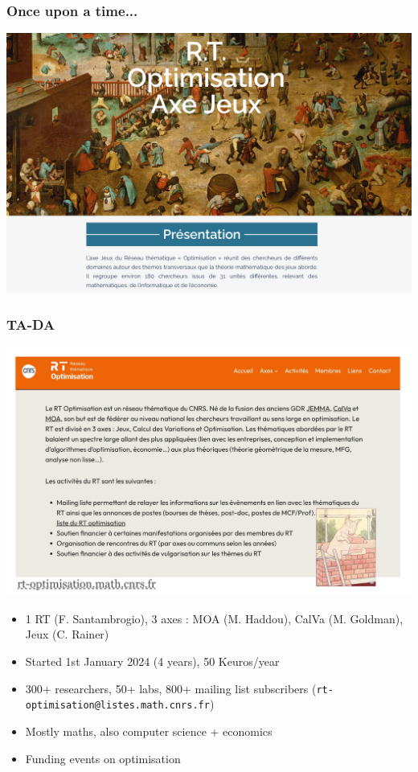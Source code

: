 \documentclass[9pt]{beamer}
\begin{document}
\begin{frame}
\frametitle{\bf Once upon a time...}
\centering \includegraphics[width=.99\textwidth]{jeux}
\end{frame}

\begin{frame}

\frametitle{\bf TA-DA}
\centering \includegraphics[width=.8\textwidth]{rt-opti}
\begin{itemize}
\item 1 RT (F. Santambrogio), 3 axes : MOA (M. Haddou), CalVa (M. Goldman), Jeux (C. Rainer)
\item Started 1st January 2024 (4 years), 50 Keuros/year
\item 300+ researchers, 50+ labs, 800+ mailing list subscribers (\texttt{rt-optimisation@listes.math.cnrs.fr})
\item Mostly maths, also computer science + economics
\item Funding events on optimisation
\end{itemize}

\end{frame}
\end{document}

